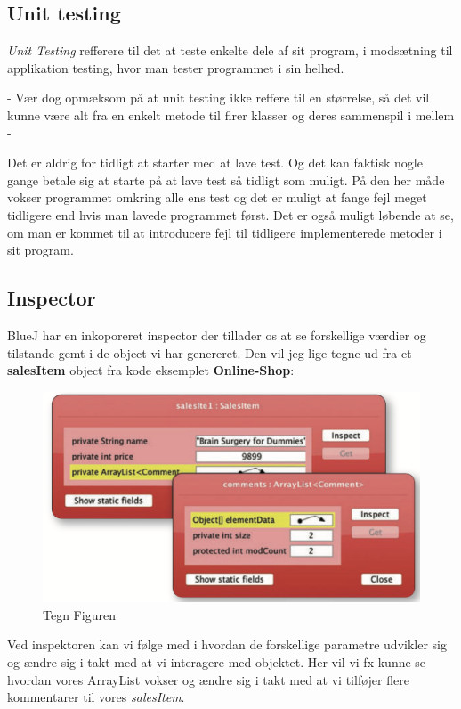 \documentclass{article}
\begin{document}
\subsection*{Unit testing}
\textit{Unit Testing} refferere til det at teste enkelte dele af sit program, i modsætning til applikation testing, hvor man tester programmet i sin helhed.

\noindent - Vær dog opmæksom på at unit testing ikke reffere til en størrelse, så det vil kunne være alt fra en enkelt metode til flrer klasser og deres sammenspil i mellem -

Det er aldrig for tidligt at starter med at lave test. Og det kan faktisk nogle gange betale sig at starte på at lave test så tidligt som muligt. På den her måde vokser programmet omkring alle ens test og det er muligt at fange fejl meget tidligere end hvis man lavede programmet først. Det er også muligt løbende at se, om man er kommet til at introducere fejl til tidligere implementerede metoder i sit program.  

\subsection*{Inspector}
BlueJ har en inkoporeret inspector der tillader os at se forskellige værdier og tilstande gemt i de object vi har genereret. Den vil jeg lige tegne ud fra et \textbf{salesItem} object fra kode eksemplet \textbf{Online-Shop}:
\begin{figure}[h]
    \centering
    \includegraphics[scale=.2]{img/BlueJ Inspector.png}
    \caption{Tegn Figuren}
\end{figure}

Ved inspektoren kan vi følge med i hvordan de forskellige parametre udvikler sig og ændre sig i takt med at vi interagere med objektet. Her vil vi fx kunne se hvordan vores ArrayList vokser og ændre sig i takt med at vi tilføjer flere kommentarer til vores \textit{salesItem}.
\end{document}
